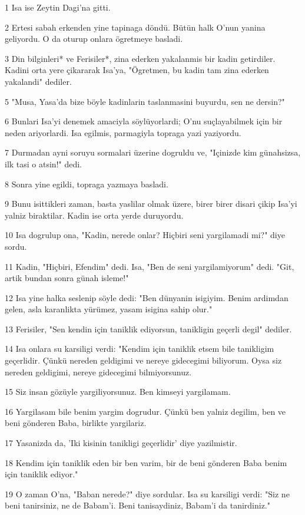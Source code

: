 \par 1 Isa ise Zeytin Dagi'na gitti.
\par 2 Ertesi sabah erkenden yine tapinaga döndü. Bütün halk O'nun yanina geliyordu. O da oturup onlara ögretmeye basladi.
\par 3 Din bilginleri* ve Ferisiler*, zina ederken yakalanmis bir kadin getirdiler. Kadini orta yere çikararak Isa'ya, "Ögretmen, bu kadin tam zina ederken yakalandi" dediler.
\par 5 "Musa, Yasa'da bize böyle kadinlarin taslanmasini buyurdu, sen ne dersin?"
\par 6 Bunlari Isa'yi denemek amaciyla söylüyorlardi; O'nu suçlayabilmek için bir neden ariyorlardi. Isa egilmis, parmagiyla topraga yazi yaziyordu.
\par 7 Durmadan ayni soruyu sormalari üzerine dogruldu ve, "Içinizde kim günahsizsa, ilk tasi o atsin!" dedi.
\par 8 Sonra yine egildi, topraga yazmaya basladi.
\par 9 Bunu isittikleri zaman, basta yaslilar olmak üzere, birer birer disari çikip Isa'yi yalniz biraktilar. Kadin ise orta yerde duruyordu.
\par 10 Isa dogrulup ona, "Kadin, nerede onlar? Hiçbiri seni yargilamadi mi?" diye sordu.
\par 11 Kadin, "Hiçbiri, Efendim" dedi. Isa, "Ben de seni yargilamiyorum" dedi. "Git, artik bundan sonra günah isleme!"
\par 12 Isa yine halka seslenip söyle dedi: "Ben dünyanin isigiyim. Benim ardimdan gelen, asla karanlikta yürümez, yasam isigina sahip olur."
\par 13 Ferisiler, "Sen kendin için taniklik ediyorsun, tanikligin geçerli degil" dediler.
\par 14 Isa onlara su karsiligi verdi: "Kendim için taniklik etsem bile tanikligim geçerlidir. Çünkü nereden geldigimi ve nereye gidecegimi biliyorum. Oysa siz nereden geldigimi, nereye gidecegimi bilmiyorsunuz.
\par 15 Siz insan gözüyle yargiliyorsunuz. Ben kimseyi yargilamam.
\par 16 Yargilasam bile benim yargim dogrudur. Çünkü ben yalniz degilim, ben ve beni gönderen Baba, birlikte yargilariz.
\par 17 Yasanizda da, 'Iki kisinin tanikligi geçerlidir' diye yazilmistir.
\par 18 Kendim için taniklik eden bir ben varim, bir de beni gönderen Baba benim için taniklik ediyor."
\par 19 O zaman O'na, "Baban nerede?" diye sordular. Isa su karsiligi verdi: "Siz ne beni tanirsiniz, ne de Babam'i. Beni tanisaydiniz, Babam'i da tanirdiniz."
